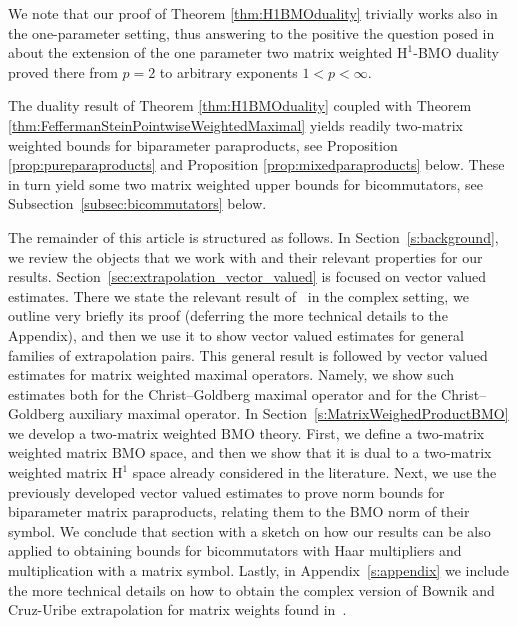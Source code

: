 \documentclass{article}
\theoremstyle{definition}
\theoremstyle{remark}
\numberwithin{equation}{section}
\newcommand{\1}{\mathbf{1}}
\begin{document}
    We note that our proof of Theorem \ref{thm:H1BMOduality} trivially works also in the one-parameter setting, thus answering to the positive the question posed in \cite{Isralowitz_2017} about the extension of the one parameter two matrix weighted $\mathrm{H}^1$-BMO duality proved there from $p=2$ to arbitrary exponents $1<p<\infty.$

    The duality result of Theorem \ref{thm:H1BMOduality} coupled with Theorem \ref{thm:FeffermanSteinPointwiseWeightedMaximal} yields readily two-matrix weighted bounds for biparameter paraproducts, see Proposition \ref{prop:pureparaproducts} and Proposition \ref{prop:mixedparaproducts} below. These in turn yield some two matrix weighted upper bounds for bicommutators, see Subsection~\ref{subsec:bicommutators} below.

    The remainder of this article is structured as follows.
    In Section~\ref{s:background}, we review the objects that we work with
    and their relevant properties for our results.
    Section~\ref{sec:extrapolation_vector_valued} is focused on vector valued estimates.
    There we state the relevant result of~\cite{Cruz_Uribe_Bownik_Extrapolation} in the complex setting,
    we outline very briefly its proof (deferring the more technical details to the Appendix),
    and then we use it to show vector valued estimates for general families of extrapolation pairs.
    This general result is followed by vector valued estimates for matrix weighted maximal operators.
    Namely, we show such estimates both for the Christ--Goldberg maximal operator
    and for the Christ--Goldberg auxiliary maximal operator.
    In Section~\ref{s:MatrixWeighedProductBMO} we develop a two-matrix weighted $\mathrm{BMO}$ theory.
    First, we define a two-matrix weighted matrix $\mathrm{BMO}$ space,
    and then we show that it is dual to a two-matrix weighted matrix $\mathrm{H}^1$
    space already considered in the literature.
    Next, we use the previously developed vector valued estimates to prove
    norm bounds for biparameter matrix paraproducts,
    relating them to the $\mathrm{BMO}$ norm of their symbol.
    We conclude that section with a sketch on how our results can be also
    applied to obtaining bounds for bicommutators with Haar multipliers and
    multiplication with a matrix symbol.
    Lastly, in Appendix~\ref{s:appendix} we include the more technical details
    on how to obtain the complex version of Bownik and Cruz-Uribe extrapolation
    for matrix weights found in~\cite{Cruz_Uribe_Bownik_Extrapolation}.
\end{document}
